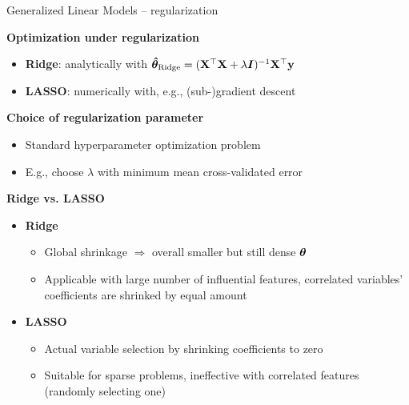 \documentclass[11pt,compress,t,notes=noshow, xcolor=table]{beamer}
\newcommand{\highlight}[1]{\textcolor{hlcol}{\textbf{#1}}}
\begin{document}
\begin{frame2}{Generalized Linear Models -- regularization}

\highlight{Optimization under regularization}
\begin{itemize}
  \item \textbf{Ridge}: analytically with 
  $\bm{\hat\theta}_{\text{Ridge}} = (\mathbf{X}^\top \mathbf{X}  + \lambda \bm{I})^{-1} \mathbf{X}^\top 
  \mathbf{y}$
  \item \textbf{LASSO}: numerically with, e.g., (sub-)gradient descent
\end{itemize}

\highlight{Choice of regularization parameter}

\begin{itemize}
  \item Standard hyperparameter optimization problem
  \item E.g., choose $\lambda$ with minimum mean cross-validated error 
\end{itemize}


\highlight{Ridge vs. LASSO} 

\begin{itemize}
  \item \textbf{Ridge}
  \begin{itemize} 
    \item Global shrinkage $\Rightarrow$ overall smaller but still dense $\bm{\theta}$
    \item Applicable with large number of influential features,
    correlated variables' coefficients are shrinked by equal amount
  \end{itemize}
  \item \textbf{LASSO}
  \begin{itemize} 
    \item Actual variable selection by shrinking coefficients to zero
    \item Suitable for sparse problems, ineffective with correlated 
    features (randomly selecting one)
  \end{itemize}  
\end{itemize}

\end{frame2}
\end{document}
